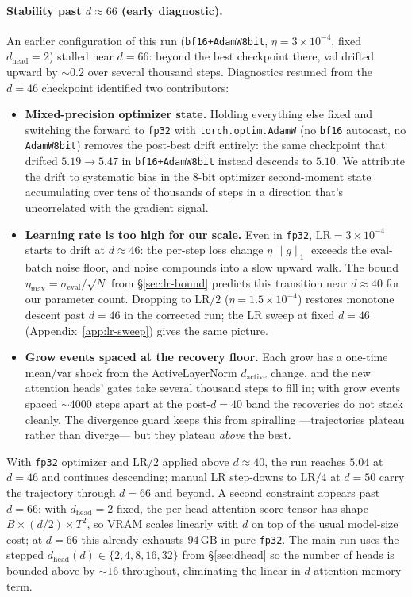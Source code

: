 \documentclass{article}
\begin{document}
\paragraph{Stability past $d \approx 66$ (early diagnostic).}
An earlier configuration of this run (\texttt{bf16+AdamW8bit},
$\eta=3{\times}10^{-4}$, fixed $d_{\text{head}}{=}2$) stalled near
$d{=}66$: beyond the best checkpoint there, val drifted upward by
$\sim 0.2$ over several thousand steps.  Diagnostics resumed from
the $d=46$ checkpoint identified two contributors:
\begin{itemize}
\item \textbf{Mixed-precision optimizer state.}
  Holding everything else fixed and switching the forward to
  \texttt{fp32} with \texttt{torch.optim.AdamW} (no \texttt{bf16}
  autocast, no \texttt{AdamW8bit}) removes the post-best drift entirely:
  the same checkpoint that drifted $5.19 \to 5.47$ in
  \texttt{bf16+AdamW8bit} instead descends to $5.10$.  We attribute the
  drift to systematic bias in the 8-bit optimizer second-moment state
  accumulating over tens of thousands of steps in a direction that's
  uncorrelated with the gradient signal.
\item \textbf{Learning rate is too high for our scale.}
  Even in \texttt{fp32}, $\mathrm{LR}=3{\times}10^{-4}$ starts to drift
  at $d \approx 46$: the per-step loss change $\eta \,\|g\|_1$ exceeds
  the eval-batch noise floor, and noise compounds into a slow upward
  walk.  The bound
  $\eta_{\max} = \sigma_{\text{eval}}/\sqrt{N}$ from
  \S\ref{sec:lr-bound} predicts this transition near $d \approx 40$
  for our parameter count.  Dropping to $\mathrm{LR}/2$
  ($\eta = 1.5\!\times\!10^{-4}$) restores monotone descent past
  $d=46$ in the corrected run; the LR sweep at fixed $d=46$
  (Appendix~\ref{app:lr-sweep}) gives the same picture.
\item \textbf{Grow events spaced at the recovery floor.}
  Each grow has a one-time mean/var shock from the ActiveLayerNorm
  $d_{\text{active}}$ change, and the new attention heads' gates take
  several thousand steps to fill in; with grow events spaced
  ${\sim}4000$ steps apart at the post-$d=40$ band the recoveries do
  not stack cleanly.  The divergence guard keeps this from spiralling
  ---trajectories plateau rather than diverge--- but they plateau
  \emph{above} the best.
\end{itemize}
With \texttt{fp32} optimizer and $\mathrm{LR}/2$ applied above
$d \approx 40$, the run reaches $5.04$ at $d{=}46$ and continues
descending; manual LR step-downs to $\mathrm{LR}/4$ at $d{=}50$ carry
the trajectory through $d{=}66$ and beyond.  A second constraint
appears past $d{=}66$: with $d_{\text{head}}{=}2$ fixed, the per-head
attention score tensor has shape $B \times (d/2) \times T^2$, so VRAM
scales linearly with $d$ on top of the usual model-size cost; at
$d{=}66$ this already exhausts $94\,\text{GB}$ in pure \texttt{fp32}.
The main run uses the stepped $d_{\text{head}}(d) \in
\{2,4,8,16,32\}$ from \S\ref{sec:dhead} so the number of heads is
bounded above by $\sim 16$ throughout, eliminating the linear-in-$d$
attention memory term.
\end{document}
